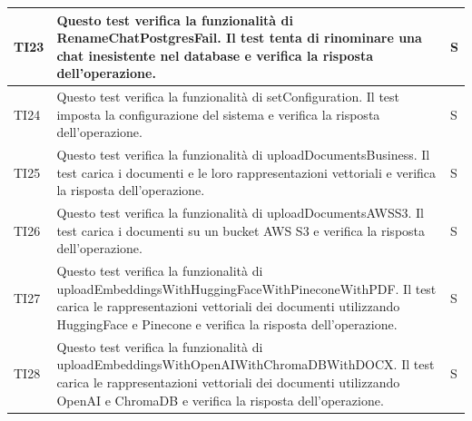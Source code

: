 \documentclass[10pt, a4paper]{article}
\begin{document}
\begin{xltabular}{\textwidth}{p{0.12\textwidth}|p{0.7\textwidth}|X}
    \hline
    TI23 & Questo test verifica la funzionalità di RenameChatPostgresFail. Il test tenta di rinominare una chat inesistente nel database e verifica la risposta dell'operazione. & S \\
    \hline
    TI24 & Questo test verifica la funzionalità di setConfiguration. Il test imposta la configurazione del sistema e verifica la risposta dell'operazione. & S \\
    \hline
    TI25 & Questo test verifica la funzionalità di uploadDocumentsBusiness. Il test carica i documenti e le loro rappresentazioni vettoriali e verifica la risposta dell'operazione. & S \\
    \hline
    TI26 & Questo test verifica la funzionalità di uploadDocumentsAWSS3. Il test carica i documenti su un bucket AWS S3 e verifica la risposta dell'operazione. & S \\
    \hline
    TI27 & Questo test verifica la funzionalità di uploadEmbeddingsWithHuggingFaceWithPineconeWithPDF. Il test carica le rappresentazioni vettoriali dei documenti utilizzando HuggingFace e Pinecone e verifica la risposta dell'operazione. & S \\
    \hline
    TI28 & Questo test verifica la funzionalità di uploadEmbeddingsWithOpenAIWithChromaDBWithDOCX. Il test carica le rappresentazioni vettoriali dei documenti utilizzando OpenAI e ChromaDB e verifica la risposta dell'operazione. & S \\
    \hline
    
    \end{xltabular}
    
\end{document}
